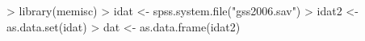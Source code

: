 \begin{Schunk}
\begin{Sinput}
> library(memisc)
> idat <- spss.system.file("gss2006.sav")
> idat2 <- as.data.set(idat)
> dat <- as.data.frame(idat2)
\end{Sinput}
\end{Schunk}
